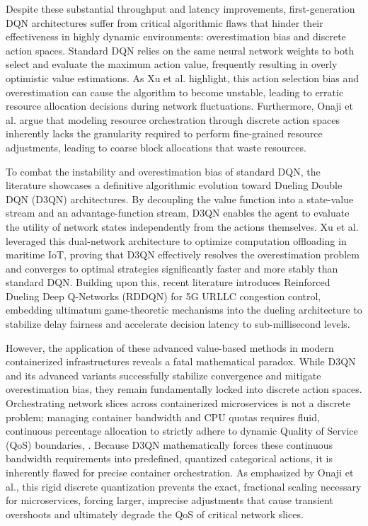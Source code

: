 \documentclass[conference]{IEEEtran}
\begin{document}
Despite these substantial throughput and latency improvements, first-generation DQN architectures suffer from critical algorithmic flaws that hinder their effectiveness in highly dynamic environments: overestimation bias and discrete action spaces. Standard DQN relies on the same neural network weights to both select and evaluate the maximum action value, frequently resulting in overly optimistic value estimations. As Xu et al. highlight, this action selection bias and overestimation can cause the algorithm to become unstable, leading to erratic resource allocation decisions during network fluctuations\cite{b13}. Furthermore, Onaji et al. argue that modeling resource orchestration through discrete action spaces inherently lacks the granularity required to perform fine-grained resource adjustments, leading to coarse block allocations that waste resources\cite{b6}.

To combat the instability and overestimation bias of standard DQN, the literature showcases a definitive algorithmic evolution toward Dueling Double DQN (D3QN) architectures. By decoupling the value function into a state-value stream and an advantage-function stream, D3QN enables the agent to evaluate the utility of network states independently from the actions themselves. Xu et al. leveraged this dual-network architecture to optimize computation offloading in maritime IoT, proving that D3QN effectively resolves the overestimation problem and converges to optimal strategies significantly faster and more stably than standard DQN\cite{b13}. Building upon this, recent literature introduces Reinforced Dueling Deep Q-Networks (RDDQN) for 5G URLLC congestion control, embedding ultimatum game-theoretic mechanisms into the dueling architecture to stabilize delay fairness and accelerate decision latency to sub-millisecond levels\cite{b16}.

However, the application of these advanced value-based methods in modern containerized infrastructures reveals a fatal mathematical paradox. While D3QN and its advanced variants successfully stabilize convergence and mitigate overestimation bias, they remain fundamentally locked into discrete action spaces\cite{b13}. Orchestrating network slices across containerized microservices is not a discrete problem; managing container bandwidth and CPU quotas requires fluid, continuous percentage allocation to strictly adhere to dynamic Quality of Service (QoS) boundaries\cite{b6}, \cite{b35}. Because D3QN mathematically forces these continuous bandwidth requirements into predefined, quantized categorical actions, it is inherently flawed for precise container orchestration\cite{b6}. As emphasized by Onaji et al., this rigid discrete quantization prevents the exact, fractional scaling necessary for microservices, forcing larger, imprecise adjustments that cause transient overshoots and ultimately degrade the QoS of critical network slices\cite{b6}.
\end{document}
